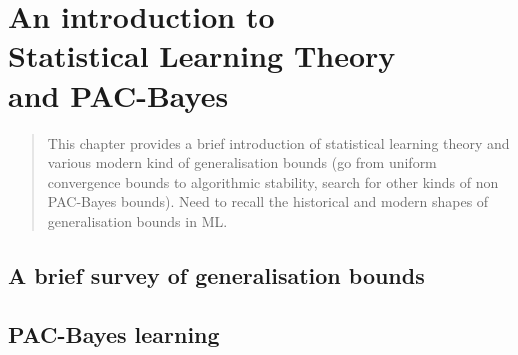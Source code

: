 \chapter[An introduction to Statistical Learning Theory and PAC-Bayes]{An introduction to\\ Statistical Learning Theory \\
and PAC-Bayes}
\label{chap:intro-stat-learning}

\minitoc

\addchapterlof
\addchapterloa
\addchapterloe

\begin{abstract}
    This chapter provides a brief introduction of statistical learning theory and various modern kind of generalisation bounds (go from uniform convergence bounds to algorithmic stability, search for other kinds of non PAC-Bayes bounds). Need to recall the historical and modern shapes of generalisation bounds in ML. 
   
\end{abstract}

\newpage

\section{A brief survey of generalisation bounds}

\section{PAC-Bayes learning}